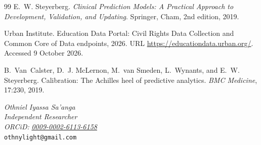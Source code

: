 \documentclass[11pt]{article}
\begin{document}
\begin{thebibliography}{99}
 E.~W. Steyerberg. \emph{Clinical Prediction Models: A Practical Approach to Development, Validation, and Updating}. Springer, Cham, 2nd edition, 2019.

 Urban Institute. Education Data Portal: Civil Rights Data Collection and Common Core of Data endpoints, 2026. URL \url{https://educationdata.urban.org/}. Accessed 9 October 2026.

 B.~Van~Calster, D.~J. McLernon, M.~van Smeden, L.~Wynants, and E.~W. Steyerberg. Calibration: The Achilles heel of predictive analytics. \emph{BMC Medicine}, 17:230, 2019.
\end{thebibliography}
\endgroup

\vspace{3ex}
\noindent\begin{minipage}{\linewidth}\small
\emph{Othniel Iyassa Sa'anga}\\
\emph{Independent Researcher}\\
\emph{ORCiD:} \href{https://orcid.org/0009-0002-6113-6158}{\color{linkblue}\emph{0009-0002-6113-6158}}\\
{\color{linkblue}\texttt{othnylight@gmail.com}}
\end{minipage}
\end{document}
